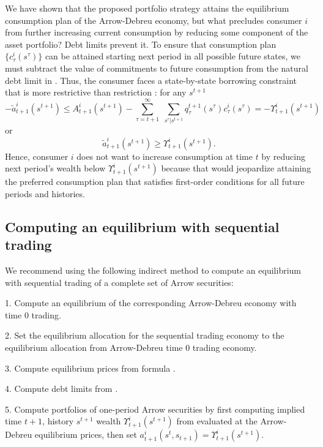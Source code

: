 We have shown that the proposed portfolio strategy attains the equilibrium
consumption plan
 of the Arrow-Debreu economy, but what
precludes consumer $i$ from further increasing current consumption by
reducing some component of the asset portfolio? Debt limits prevent it.  
 To ensure that consumption plan
$\{c^i_\tau(s^\tau)\}$
can be attained starting next period in all possible future states,
we must subtract the value of commitments to future
consumption
from the natural debt limit in .
 Thus, the consumer faces a
state-by-state borrowing constraint that is more
 restrictive than restriction :
for any $s^{t+1}$
$$  -  \tilde a^i_{t+1}(s^{t+1}) \leq  A^i_{t+1}(s^{t+1} )
- \sum_{\tau=t+1}^\infty \; \sum_{s^\tau \vert s^{t+1}}
  q_\tau^{t+1}(s^\tau) c^i_\tau(s^\tau)
  = - \Upsilon^i_{t+1}(s^{t+1})$$
or
$$   \tilde a^i_{t+1}(s^{t+1})  \geq  \Upsilon^i_{t+1}(s^{t+1}). $$
Hence, consumer $i$ does not want to increase consumption at time $t$ by
reducing next period's wealth below $\Upsilon^i_{t+1}(s^{t+1})$ because
that would jeopardize attaining the preferred consumption plan
that satisfies first-order conditions  for all future periods and
histories.


\subsection{Computing an equilibrium with sequential
            trading}\label{sec:example4cont}%
We  recommend using the following indirect method to compute 
an equilibrium  with sequential trading of a complete set of Arrow securities:

\medskip
\item {1.}  Compute an equilibrium of the corresponding  Arrow-Debreu economy with time $0$ trading.
\medskip
\item {2.} Set the equilibrium allocation for the sequential trading economy to  the equilibrium allocation from Arrow-Debreu
time $0$ trading economy.
\medskip
\item {3.} Compute equilibrium prices from formula .
\medskip
\item{4.} Compute debt limits from .
\medskip
\item {5.}  Compute portfolios of one-period Arrow securities  by first computing implied time $t+1$, history $s^{t+1}$
wealth $\Upsilon^i_{t+1}(s^{t+1}) $ from  evaluated at the Arrow-Debreu equilibrium prices,
then set $a^i_{t+1}(s^t,s_{t+1}) 
          = \Upsilon^i_{t+1}(s^{t+1})$.

